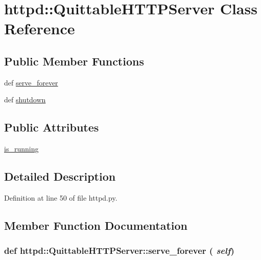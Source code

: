 \hypertarget{classhttpd_1_1_quittable_h_t_t_p_server}{
\section{httpd::QuittableHTTPServer Class Reference}
\label{classhttpd_1_1_quittable_h_t_t_p_server}
}
\subsection*{Public Member Functions}
\begin{DoxyCompactItemize}
\item 
def \hyperlink{classhttpd_1_1_quittable_h_t_t_p_server_ad7da0003b17805e7e629fa09a3a8f187}{serve\_\-forever}
\item 
def \hyperlink{classhttpd_1_1_quittable_h_t_t_p_server_a7d527531f10ecbcb1db670cf816bbcbd}{shutdown}
\end{DoxyCompactItemize}
\subsection*{Public Attributes}
\begin{DoxyCompactItemize}
\item 
\hyperlink{classhttpd_1_1_quittable_h_t_t_p_server_a72e565dcba798dfd43d18268e92075a8}{is\_\-running}
\end{DoxyCompactItemize}


\subsection{Detailed Description}


Definition at line 50 of file httpd.py.



\subsection{Member Function Documentation}
\hypertarget{classhttpd_1_1_quittable_h_t_t_p_server_ad7da0003b17805e7e629fa09a3a8f187}{
\subsubsection[{serve\_\-forever}]{\setlength{\rightskip}{0pt plus 5cm}def httpd::QuittableHTTPServer::serve\_\-forever ( {\em self})}}
\label{classhttpd_1_1_quittable_h_t_t_p_server_ad7da0003b17805e7e629fa09a3a8f187}


